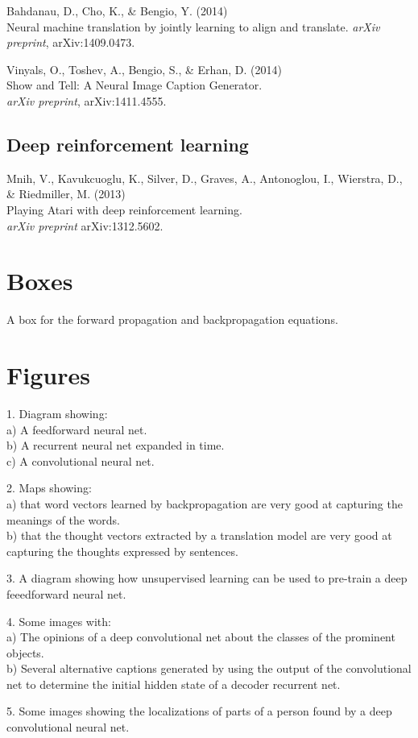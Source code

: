\documentclass[]{article}
\begin{document}
Bahdanau, D., Cho, K., \& Bengio, Y. (2014)\\ Neural machine translation by
jointly learning to align and translate.  {\it arXiv preprint}, arXiv:1409.0473.

Vinyals, O., Toshev, A., Bengio, S., \& Erhan, D. (2014)\\ Show and Tell: A
Neural Image Caption Generator.\\ {\it arXiv preprint}, arXiv:1411.4555.




\subsection{Deep reinforcement learning}
Mnih, V., Kavukcuoglu, K., Silver, D., Graves, A., Antonoglou, I., Wierstra, D.,
\& Riedmiller, M. (2013)\\ Playing Atari with deep reinforcement
learning.\\ {\it arXiv preprint} arXiv:1312.5602.

\newpage

\section{Boxes}

A box for the forward propagation and backpropagation equations.

\section{Figures}

1. Diagram showing:\\ a) A feedforward neural net.\\ b) A recurrent neural net
expanded in time.\\ c) A convolutional neural net.

2. Maps showing:\\ a) that word vectors learned by backpropagation are very good
at capturing the meanings of the words.\\ b) that the thought vectors extracted
by a translation model are very good at capturing the thoughts expressed by
sentences.

3. A diagram showing how unsupervised learning can be used to pre-train a deep
feeedforward neural net.

4. Some images with:\\ a) The opinions of a deep convolutional net about the
classes of the prominent objects.\\ b) Several alternative captions generated by
using the output of the convolutional net to determine the initial hidden state
of a decoder recurrent net.
 
5. Some images showing the localizations of parts of a person found by a deep
convolutional neural net.\\
\end{document}
